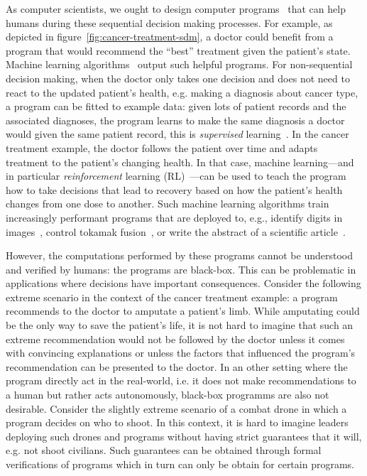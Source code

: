 As computer scientists, we ought to design computer programs~\cite{knuth63} that can help humans during these sequential decision making processes. 
For example, as depicted in figure~\ref{fig:cancer-treatment-sdm}, a doctor could benefit from a program that would recommend the ``best'' treatment given the patient's state. 
Machine learning algorithms~\cite{turing} output such helpful programs.
For non-sequential decision making, when the doctor only takes one decision and does not need to react to the updated patient's health, e.g. making a diagnosis about cancer type, a program can be fitted to example data: given lots of patient records and the associated diagnoses, the program learns to make the same diagnosis a doctor would given the same patient record, this is \textit{supervised} learning~\cite{sl}. 
In the cancer treatment example, the doctor follows the patient over time and adapts treatment to the patient's changing health. In that case, machine learning—and in particular \textit{reinforcement} learning (RL)~\cite{sutton}—can be used to teach the program how to take decisions that lead to recovery based on how the patient's health changes from one dose to another.  
Such machine learning algorithms train increasingly performant programs that are deployed to, e.g., identify digits in images~\cite{lenet}, control tokamak fusion~\cite{tokamak}, or write the abstract of a scientific article~\cite{reinforce-llm}.

However, the computations performed by these programs cannot be understood and verified by humans: the programs are black-box.
This can be problematic in applications where decisions have important consequences. 
Consider the following extreme scenario in the context of the cancer treatment example: a program recommends to the doctor to amputate a patient's limb.
While amputating could be the only way to save the patient's life, it is not hard to imagine that such an extreme recommendation would not be followed by the doctor unless it comes with convincing explanations or unless the factors that influenced the program's recommendation can be presented to the doctor. 
In an other setting where the program directly act in the real-world, i.e. it does not make recommendations to a human but rather acts autonomously, black-box programms are also not desirable.
Consider the slightly extreme scenario of a combat drone in which a program decides on who to shoot.
In this context, it is hard to imagine leaders deploying such drones and programs without having strict guarantees that it will, e.g. not shoot civilians.
Such guarantees can be obtained through formal verifications of programs which in turn can only be obtain for certain programs.

